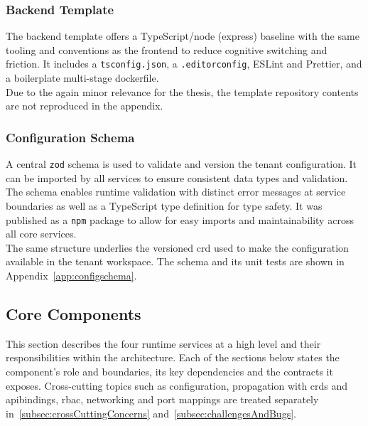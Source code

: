 \documentclass[11pt, a4paper, oneside, listof=totoc]{scrartcl}
\begin{document}
            \subsubsection{Backend Template}\label{subsubsec:backendTemplate}
                The backend template offers a TypeScript/\gls{node} (\gls{express}) baseline with the same
                tooling and conventions as the frontend to reduce cognitive switching and friction.
                It includes a \texttt{tsconfig.json}, a \texttt{.editorconfig}, ESLint and Prettier,
                and a boilerplate multi-stage dockerfile.\\
                Due to the again minor relevance for the thesis, the template repository contents
                are not reproduced in the appendix.

            \subsubsection{Configuration Schema}\label{subsubsec:configSchema}
                A central \texttt{zod} schema is used to validate and version the tenant
                configuration.
                It can be imported by all services to ensure consistent data types and validation.
                The schema enables runtime validation with distinct error messages at service 
                boundaries as well as a TypeScript type definition for type safety.
                It was published as a \texttt{npm} package to allow for easy imports and
                maintainability across all core services.\\
                The same structure underlies the versioned \gls{crd} used to make the configuration
                available in the tenant workspace.
                The schema and its unit tests are shown in Appendix~\ref{app:configschema}.

    \clearpage

        \subsection{Core Components}\label{subsec:coreComponents}
            This section describes the four runtime services at a high level and their
            responsibilities within the architecture.
            Each of the sections below states the component's role and boundaries, its key
            dependencies and the contracts it exposes.
            Cross-cutting topics such as configuration, propagation with \glspl{crd} and
            \glspl{apibinding}, \gls{rbac}, networking and port mappings are treated separately
            in~\ref{subsec:crossCuttingConcerns} and~\ref{subsec:challengesAndBugs}.
\end{document}
